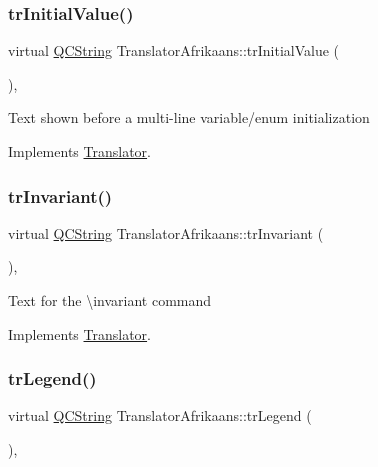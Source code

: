 \subsubsection{\texorpdfstring{trInitialValue()}{trInitialValue()}}
{\footnotesize\ttfamily virtual \mbox{\hyperlink{class_q_c_string}{Q\+C\+String}} Translator\+Afrikaans\+::tr\+Initial\+Value (\begin{DoxyParamCaption}{ }\end{DoxyParamCaption})\hspace{0.3cm}{\ttfamily [inline]}, {\ttfamily [virtual]}}

Text shown before a multi-\/line variable/enum initialization 

Implements \mbox{\hyperlink{class_translator}{Translator}}.

\mbox{\label{class_translator_afrikaans_a3b8c2c307e4fe55a2add83e9b7b50b0c}} 
\subsubsection{\texorpdfstring{trInvariant()}{trInvariant()}}
{\footnotesize\ttfamily virtual \mbox{\hyperlink{class_q_c_string}{Q\+C\+String}} Translator\+Afrikaans\+::tr\+Invariant (\begin{DoxyParamCaption}{ }\end{DoxyParamCaption})\hspace{0.3cm}{\ttfamily [inline]}, {\ttfamily [virtual]}}

Text for the \textbackslash{}invariant command 

Implements \mbox{\hyperlink{class_translator}{Translator}}.

\mbox{\label{class_translator_afrikaans_a29c97213cc15fde79f8b55c9c4cd5157}} 
\subsubsection{\texorpdfstring{trLegend()}{trLegend()}}
{\footnotesize\ttfamily virtual \mbox{\hyperlink{class_q_c_string}{Q\+C\+String}} Translator\+Afrikaans\+::tr\+Legend (\begin{DoxyParamCaption}{ }\end{DoxyParamCaption})\hspace{0.3cm}{\ttfamily [inline]}, {\ttfamily [virtual]}}

